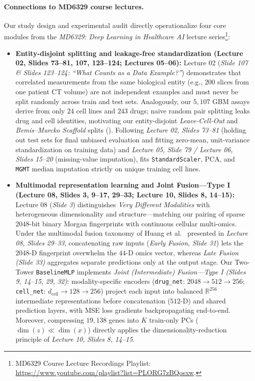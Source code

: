 \documentclass{article}
\begin{document}
\paragraph{Connections to MD6329 course lectures.}
Our study design and experimental audit directly operationalize four core modules from the \emph{MD6329: Deep Learning in Healthcare AI} lecture series\footnote{MD6329 Course Lecture Recordings Playlist: \url{https://www.youtube.com/playlist?list=PLORG7zBQosxw}.}:
\begin{itemize}
  \setlength{\itemsep}{1pt}\setlength{\parskip}{0pt}\setlength{\topsep}{2pt}
  \item \textbf{Entity-disjoint splitting and leakage-free standardization (Lecture 02, Slides 73--81, 107, 123--124; Lectures 05--06):} Lecture 02 (\emph{Slide 107 \& Slides 123--124: ``What Counts as a Data Example?''}) demonstrates that correlated measurements from the same biological entity (e.g., $200$ slices from one patient CT volume) are not independent examples and must never be split randomly across train and test sets. Analogously, our $5,107$ GBM assays derive from only $24$ cell lines and $243$ drugs; naive random pair splitting leaks drug and cell identities, motivating our entity-disjoint \emph{Leave-Cell-Out} and \emph{Bemis--Murcko Scaffold} splits (). Following \emph{Lecture 02, Slides 73--81} (holding out test sets for final unbiased evaluation and fitting zero-mean, unit-variance standardization on training data) and \emph{Lecture 05, Slide 79 / Lecture 06, Slides 15--20} (missing-value imputation),  fits \texttt{StandardScaler}, PCA, and \texttt{MGMT} median imputation strictly on unique training cell lines.
  \item \textbf{Multimodal representation learning and Joint Fusion---Type I (Lecture 08, Slides 3, 9--17, 29--33; Lecture 10, Slides 8, 14--15):} Lecture 08 (\emph{Slide 3}) distinguishes \emph{Very Different Modalities} with heterogeneous dimensionality and structure---matching our pairing of sparse $2048$-bit binary Morgan fingerprints with continuous cellular multi-omics. Under the multimodal fusion taxonomy of Huang et al.~\cite{huang2020fusion} presented in \emph{Lecture 08, Slides 29--33}, concatenating raw inputs (\emph{Early Fusion, Slide 31}) lets the $2048$-D fingerprint overwhelm the $44$-D omics vector, whereas \emph{Late Fusion (Slide 33)} aggregates separate predictions only at the output stage. Our Two-Tower \texttt{BaselineMLP} implements \emph{Joint (Intermediate) Fusion---Type I (Slides 9, 14--15, 29, 32)}: modality-specific encoders (\texttt{drug\_net}: $2048 \to 512 \to 256$; \texttt{cell\_net}: $d_{\text{cell}} \to 128 \to 256$) project each input into balanced $\mathbb{R}^{256}$ intermediate representations before concatenation ($512$-D) and shared prediction layers, with MSE loss gradients backpropagating end-to-end. Moreover, compressing $19,138$ genes into $K$ train-only PCs ($\dim(z) \ll \dim(x)$) directly applies the dimensionality-reduction principle of \emph{Lecture 10, Slides 8, 14--15}.

\end{itemize}
\end{document}
